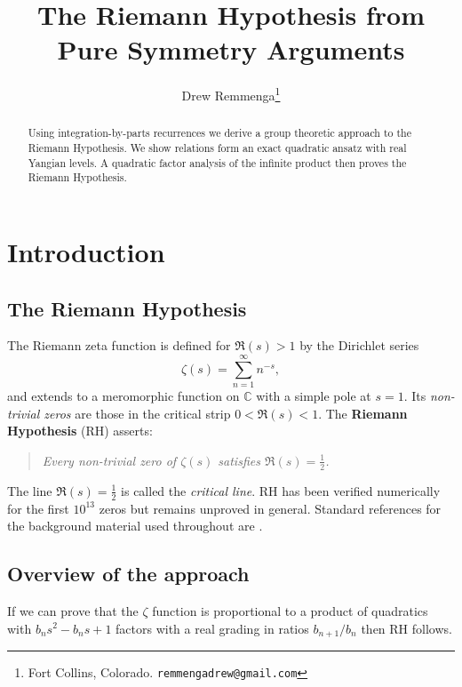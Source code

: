 \documentclass[article]{article}
\theoremstyle{plain}
\theoremstyle{definition}
\newcommand{\C}{\mathbb{C}}
\begin{document}
\title{The Riemann Hypothesis from Pure Symmetry Arguments}

\author{Drew Remmenga\thanks{Fort Collins, Colorado. \texttt{remmengadrew@gmail.com}}}

\maketitle

\begin{abstract}
Using integration-by-parts recurrences we derive a group theoretic approach to the Riemann Hypothesis. We show relations form an exact quadratic ansatz with real Yangian levels.
A quadratic factor analysis of the infinite product then proves the Riemann Hypothesis.
\end{abstract}


\section{Introduction}

\subsection{The Riemann Hypothesis}

The Riemann zeta function is defined for $\Re(s)>1$ by the Dirichlet series
\[
\zeta(s)=\sum_{n=1}^{\infty}n^{-s},
\]
and extends to a meromorphic function on $\C$ with a simple pole at $s=1$.
Its \emph{non-trivial zeros} are those in the critical strip $0<\Re(s)<1$.
The \textbf{Riemann Hypothesis} (RH) asserts:
\begin{quote}
\itshape Every non-trivial zero of $\zeta(s)$ satisfies $\Re(s)=\tfrac{1}{2}$.
\end{quote}
The line $\Re(s)=\tfrac{1}{2}$ is called the \emph{critical line}.
RH has been verified numerically for the first $10^{13}$ zeros
\cite{Odlyzko,Gourdon2004} but remains unproved in general.
Standard references for the background material used throughout are
\cite{Davenport1980,Titchmarsh1986,IwaniecKowalski2004}.

\subsection{Overview of the approach}

If we can prove that the $\zeta$ function is proportional to a product of quadratics with $b_n s^2-b_ns+1$ factors with a real grading in ratios $b_{n+1}/b_{n}$ then RH follows.
\end{document}
